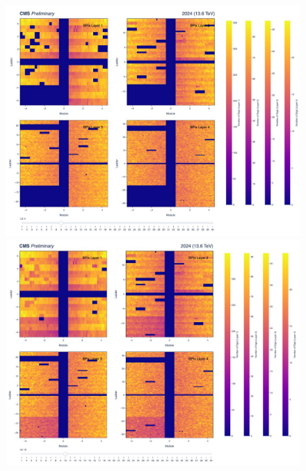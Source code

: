 \begin{figure}[H]
  \centering
  \begin{minipage}{0.48\textwidth}
    \centering
    \includegraphics[width=\linewidth]{images/ls9.png}
  \end{minipage}
  \hfill
  \begin{minipage}{0.48\textwidth}
    \centering
    \includegraphics[width=\linewidth]{images/ls10.png}
  \end{minipage}
  \vfill
  \begin{minipage}{0.48\textwidth}
    \centering

\end{minipage}
\end{figure}
